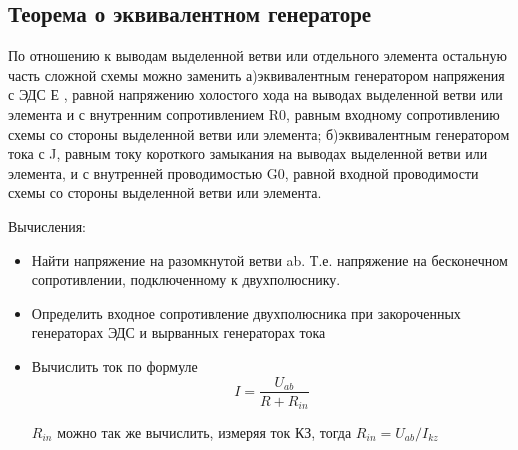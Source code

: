 \subsection{Теорема о эквивалентном генераторе}

По отношению к выводам выделенной ветви или отдельного элемента остальную часть сложной схемы можно заменить а)эквивалентным генератором напряжения с ЭДС Е , равной напряжению холостого хода на выводах выделенной ветви или элемента и с внутренним сопротивлением R0, равным входному сопротивлению схемы со стороны выделенной ветви или элемента; б)эквивалентным генератором тока с J, равным току короткого замыкания на выводах выделенной ветви или элемента, и с внутренней проводимостью G0, равной входной проводимости схемы со стороны выделенной ветви или элемента.


Вычисления:

\begin{itemize}
\item
Найти напряжение на разомкнутой ветви ab. Т.е. напряжение на бесконечном сопротивлении, подключенному к двухполюснику.
\item
Определить входное сопротивление двухполюсника при закороченных генераторах ЭДС и вырванных генераторах тока
\item
Вычислить ток по формуле
\begin{equation}
I = \frac{U_{ab}}{R+R_{in}}
\end{equation}

$R_{in}$ можно так же вычислить, измеряя ток КЗ, тогда $R_{in}=U_{ab}/I_{kz}$

\end{itemize}


\pagebreak
